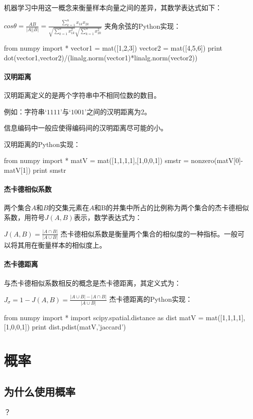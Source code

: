 \documentclass[11pt]{book}
\newcounter{#2}
\newcounter{#2}[#1]
\numberwithin{#2}{#1}
\begin{document}
机器学习中用这一概念来衡量样本向量之间的差异，其数学表达式如下：

$ cos\theta =\frac{AB}{\left| A \right| \left|B \right| } =\frac{\sum_{k=1}^{n}{x_{1k}x_{2k} } }{\sqrt{\sum_{k=1}^{n}{x_{1k}^{2} } } \sqrt{\sum_{k=1}^{n}{x_{2k}^{2} } } }  $
夹角余弦的Python实现：

from numpy import *
vector1 = mat([1,2,3])
vector2 = mat([4,5,6])
print dot(vector1,vector2)/(linalg.norm(vector1)*linalg.norm(vector2))
\paragraph{汉明距离}

汉明距离定义的是两个字符串中不相同位数的数目。

例如：字符串$ ‘1111’ $与$ ‘1001’ $之间的汉明距离为2。

信息编码中一般应使得编码间的汉明距离尽可能的小。

汉明距离的Python实现：

from numpy import *
matV = mat([1,1,1,1],[1,0,0,1])
smstr = nonzero(matV[0]-matV[1])
print smstr
\paragraph{杰卡德相似系数}

两个集合$ A $和$ B $的交集元素在$ A $和$  $B的并集中所占的比例称为两个集合的杰卡德相似系数，用符号$ J(A,B) $表示，数学表达式为：

$ J\left( A,B \right) =\frac{\left| A\cap B\right| }{\left|A\cup B \right| }  $
杰卡德相似系数是衡量两个集合的相似度的一种指标。一般可以将其用在衡量样本的相似度上。

\paragraph{杰卡德距离}

与杰卡德相似系数相反的概念是杰卡德距离，其定义式为：

$ J_{\sigma} =1-J\left( A,B \right) =\frac{\left| A\cup B \right| -\left| A\cap B \right| }{\left| A\cup B \right| }  $
杰卡德距离的Python实现：

from numpy import *
import scipy.spatial.distance as dist
matV = mat([1,1,1,1],[1,0,0,1])
print dist.pdist(matV,'jaccard')
\section{概率}

\subsection{为什么使用概率}？ 
\end{document}
